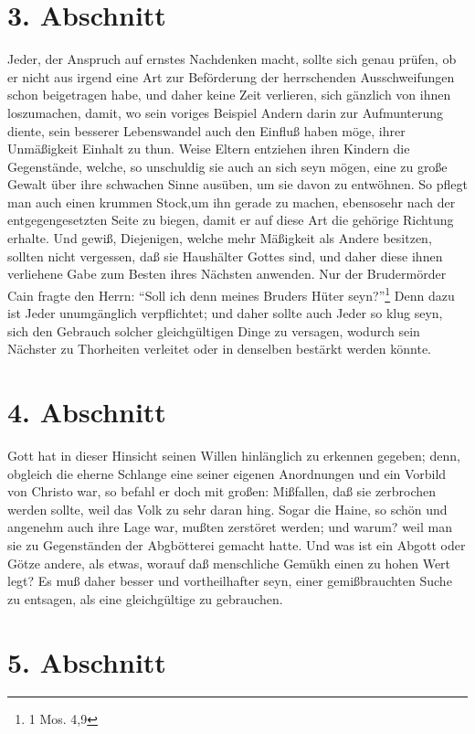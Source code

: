 \section{3. Abschnitt}

Jeder, der Anspruch auf ernstes Nachdenken macht, sollte sich genau prüfen, ob
er nicht aus irgend eine Art zur Beförderung der herrschenden Ausschweifungen
schon beigetragen habe, und daher keine Zeit verlieren, sich gänzlich von ihnen
loszumachen, damit, wo sein voriges Beispiel Andern darin zur Aufmunterung
diente, sein besserer Lebenswandel auch den Einfluß haben möge, ihrer
Unmäßigkeit Einhalt zu thun. Weise Eltern entziehen ihren Kindern die
Gegenstände, welche, so unschuldig sie auch an sich seyn mögen, eine zu große
Gewalt über ihre schwachen Sinne ausüben, um sie davon zu entwöhnen. So pflegt
man auch einen krummen Stock,um ihn gerade zu machen, ebensosehr nach der
entgegengesetzten Seite zu biegen, damit er auf diese Art die gehörige Richtung
erhalte. Und gewiß, Diejenigen, welche mehr Mäßigkeit als Andere besitzen,
sollten nicht vergessen, daß sie Haushälter Gottes sind, und daher diese ihnen
verliehene Gabe zum Besten ihres Nächsten anwenden. Nur der Brudermörder Cain
fragte den Herrn: "`Soll ich denn meines Bruders Hüter seyn?"'\footnote{1 Mos.
4,9} Denn dazu ist Jeder unumgänglich verpflichtet; und daher sollte auch Jeder
so klug seyn, sich den Gebrauch solcher gleichgültigen Dinge zu versagen,
wodurch sein Nächster zu Thorheiten verleitet oder in denselben bestärkt werden
könnte.

\section{4. Abschnitt}

Gott hat in dieser Hinsicht seinen Willen hinlänglich zu erkennen gegeben; denn,
obgleich die eherne Schlange eine seiner eigenen Anordnungen und ein Vorbild von
Christo war, so befahl er doch mit großen: Mißfallen, daß sie zerbrochen werden
sollte, weil das Volk zu sehr daran hing. Sogar die Haine, so schön und angenehm
auch ihre Lage war, mußten zerstöret werden; und warum? weil man sie zu
Gegenständen der Abgbötterei gemacht hatte. Und was ist ein Abgott oder Götze
andere, als etwas, worauf daß menschliche Gemükh einen zu hohen Wert legt? Es
muß daher besser und vortheilhafter seyn, einer gemißbrauchten Suche zu
entsagen, als eine gleichgültige zu gebrauchen.

\section{5. Abschnitt}

